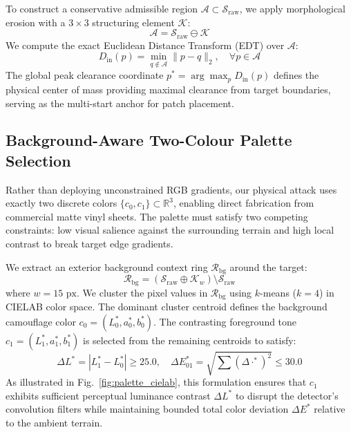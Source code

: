 \documentclass[conference]{IEEEtran}
\begin{document}
To construct a conservative admissible region $\mathcal{A} \subset \mathcal{S}_{\text{raw}}$, we apply morphological erosion with a $3\times 3$ structuring element $\mathcal{K}$:
\begin{equation}
\mathcal{A} = \mathcal{S}_{\text{raw}} \ominus \mathcal{K}
\end{equation}
We compute the exact Euclidean Distance Transform (EDT) over $\mathcal{A}$:
\begin{equation}
D_{\text{in}}(p) = \min_{q \notin \mathcal{A}} \|p - q\|_2, \quad \forall p \in \mathcal{A}
\end{equation}
The global peak clearance coordinate $p^* = \arg\max_{p} D_{\text{in}}(p)$ defines the physical center of mass providing maximal clearance from target boundaries, serving as the multi-start anchor for patch placement.

\subsection{Background-Aware Two-Colour Palette Selection}
Rather than deploying unconstrained RGB gradients, our physical attack uses exactly two discrete colors $\{c_0, c_1\} \subset \mathbb{R}^3$, enabling direct fabrication from commercial matte vinyl sheets. The palette must satisfy two competing constraints: low visual salience against the surrounding terrain and high local contrast to break target edge gradients.

We extract an exterior background context ring $\mathcal{R}_{\text{bg}}$ around the target:
\begin{equation}
\mathcal{R}_{\text{bg}} = (\mathcal{S}_{\text{raw}} \oplus \mathcal{K}_{w}) \setminus \mathcal{S}_{\text{raw}}
\end{equation}
where $w = 15\text{ px}$. We cluster the pixel values in $\mathcal{R}_{\text{bg}}$ using $k$-means ($k=4$) in CIELAB color space. The dominant cluster centroid defines the background camouflage color $c_0 = (L_0^*, a_0^*, b_0^*)$. The contrasting foreground tone $c_1 = (L_1^*, a_1^*, b_1^*)$ is selected from the remaining centroids to satisfy:
\begin{equation}
\Delta L^* = |L_1^* - L_0^*| \ge 25.0, \quad \Delta E_{01}^* = \sqrt{\sum (\Delta \cdot^*)^2} \le 30.0
\end{equation}
As illustrated in Fig.~\ref{fig:palette_cielab}, this formulation ensures that $c_1$ exhibits sufficient perceptual luminance contrast $\Delta L^*$ to disrupt the detector's convolution filters while maintaining bounded total color deviation $\Delta E^*$ relative to the ambient terrain.
\end{document}
